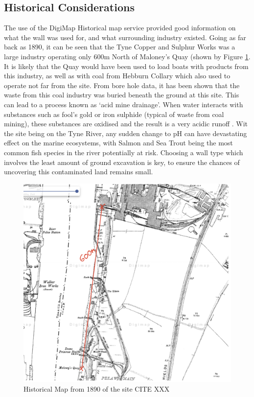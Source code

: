 \documentclass[12pt, a4paper]{article}
\begin{document}
\subsection{Historical Considerations}
The use of the DigiMap Historical map service provided good information on what the wall was used for, and what surrounding industry existed. Going as far back as 1890, it can be seen that the Tyne Copper and Sulphur Works was a large industry operating only 600m North of Maloney's Quay (shown by Figure \ref{hist}. It is likely that the Quay would have been used to load boats with products from this industry, as well as with coal from Hebburn Collary which also used to operate not far from the site. From bore hole data, it has been shown that the waste from this coal industry was buried beneath the ground at this site. This can lead to a process known as `acid mine drainage'. When water interacts with substances such as fool's gold or iron sulphide (typical of waste from coal mining), these substances are oxidised and the result is a very acidic runoff \cite{c}. Wit the site being on the Tyne River, any sudden change to pH can have devastating effect on the marine ecosystems, with Salmon and Sea Trout being the most common fish species in the river potentially at risk. Choosing a wall type which involves the least amount of ground excavation is key, to ensure the chances of uncovering this contaminated land remains small.

\begin{figure}[H]
  \centering
  	\includegraphics[width=0.5\textheight]{histmap}
   	\caption{Historical Map from 1890 of the site CITE XXX}
	\label{hist}
\end{figure}
\end{document}
